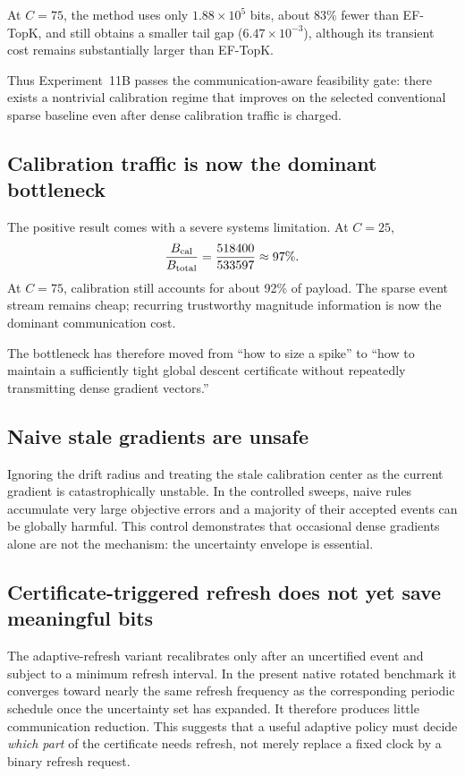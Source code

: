 At $C=75$, the method uses only $1.88\times10^5$ bits, about 83\% fewer than EF-TopK, and still obtains a smaller tail gap ($6.47\times10^{-3}$), although its transient cost remains substantially larger than EF-TopK.

Thus Experiment~11B passes the communication-aware feasibility gate: there exists a nontrivial calibration regime that improves on the selected conventional sparse baseline even after dense calibration traffic is charged.

\subsection{Calibration traffic is now the dominant bottleneck}

The positive result comes with a severe systems limitation. At $C=25$,
\begin{equation}
  \frac{B_{\rm cal}}{B_{\rm total}}
  =
  \frac{518400}{533597}
  \approx97\%.
\end{equation}
At $C=75$, calibration still accounts for about 92\% of payload. The sparse event stream remains cheap; recurring trustworthy magnitude information is now the dominant communication cost.

The bottleneck has therefore moved from ``how to size a spike'' to ``how to maintain a sufficiently tight global descent certificate without repeatedly transmitting dense gradient vectors.''

\subsection{Naive stale gradients are unsafe}

Ignoring the drift radius and treating the stale calibration center as the current gradient is catastrophically unstable. In the controlled sweeps, naive rules accumulate very large objective errors and a majority of their accepted events can be globally harmful. This control demonstrates that occasional dense gradients alone are not the mechanism: the uncertainty envelope is essential.

\subsection{Certificate-triggered refresh does not yet save meaningful bits}

The adaptive-refresh variant recalibrates only after an uncertified event and subject to a minimum refresh interval. In the present native rotated benchmark it converges toward nearly the same refresh frequency as the corresponding periodic schedule once the uncertainty set has expanded. It therefore produces little communication reduction. This suggests that a useful adaptive policy must decide \emph{which part} of the certificate needs refresh, not merely replace a fixed clock by a binary refresh request.

